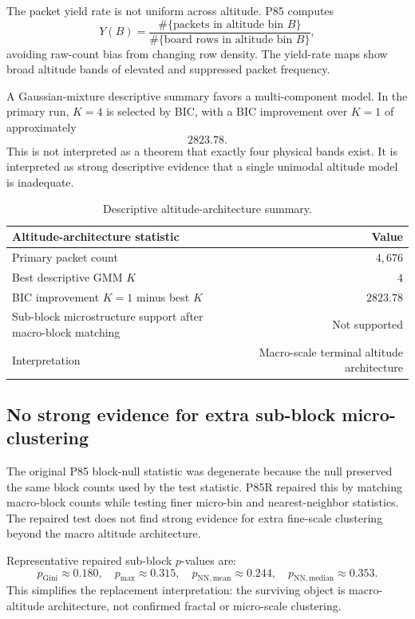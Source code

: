 \documentclass[11pt]{article}
\newcommand{\primarypackets}{4{,}676}
\begin{document}
The packet yield rate is not uniform across altitude. P85 computes
\[
Y(B)=\frac{\#\{\text{packets in altitude bin }B\}}
          {\#\{\text{board rows in altitude bin }B\}},
\]
avoiding raw-count bias from changing row density. The yield-rate maps show broad altitude bands of elevated and suppressed packet frequency.

A Gaussian-mixture descriptive summary favors a multi-component model. In the primary run, \(K=4\) is selected by BIC, with a BIC improvement over \(K=1\) of approximately
\[
2823.78.
\]
This is not interpreted as a theorem that exactly four physical bands exist. It is interpreted as strong descriptive evidence that a single unimodal altitude model is inadequate.

\begin{table}[H]
\centering
\small
\begin{tabular}{lr}
\toprule
\textbf{Altitude-architecture statistic} & \textbf{Value} \\
\midrule
Primary packet count & \(\primarypackets\) \\
Best descriptive GMM \(K\) & \(4\) \\
BIC improvement \(K=1\) minus best \(K\) & \(2823.78\) \\
Sub-block microstructure support after macro-block matching & Not supported \\
Interpretation & Macro-scale terminal altitude architecture \\
\bottomrule
\end{tabular}
\caption{Descriptive altitude-architecture summary.}
\label{tab:altitude-architecture}
\end{table}

\subsection{No strong evidence for extra sub-block micro-clustering}

The original P85 block-null statistic was degenerate because the null preserved the same block counts used by the test statistic. P85R repaired this by matching macro-block counts while testing finer micro-bin and nearest-neighbor statistics. The repaired test does not find strong evidence for extra fine-scale clustering beyond the macro altitude architecture.

Representative repaired sub-block \(p\)-values are:
\[
p_{\mathrm{Gini}}\approx 0.180,\quad
p_{\max}\approx 0.315,\quad
p_{\mathrm{NN,mean}}\approx 0.244,\quad
p_{\mathrm{NN,median}}\approx 0.353.
\]
This simplifies the replacement interpretation: the surviving object is macro-altitude architecture, not confirmed fractal or micro-scale clustering.
\end{document}
